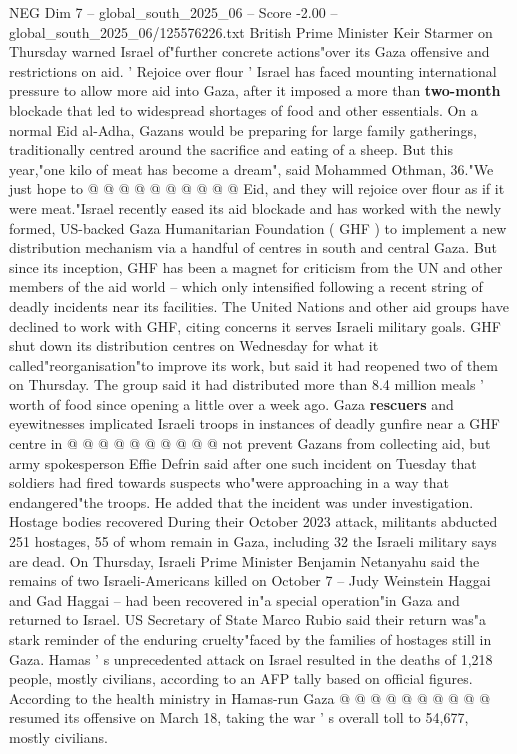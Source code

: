 \begin{textsample}{NEG Dim 7 – global\_south\_2025\_06 – Score -2.00 – global\_south\_2025\_06/125576226.txt}
British Prime Minister Keir Starmer on Thursday warned Israel of"further concrete actions"over its Gaza offensive and restrictions on aid. ' Rejoice over flour ' Israel has faced mounting international pressure to allow more aid into Gaza, after it imposed a more than \textbf{two-month} blockade that led to widespread shortages of food and other essentials.
On a normal Eid al-Adha, Gazans would be preparing for large family gatherings, traditionally centred around the sacrifice and eating of a sheep.
But this year,"one kilo of meat has become a dream", said Mohammed Othman, 36."We just hope to @ @ @ @ @ @ @ @ @ @ Eid, and they will rejoice over flour as if it were meat."Israel recently eased its aid blockade and has worked with the newly formed, US-backed Gaza Humanitarian Foundation ( GHF ) to implement a new distribution mechanism via a handful of centres in south and central Gaza.
But since its inception, GHF has been a magnet for criticism from the UN and other members of the aid world -- which only intensified following a recent string of deadly incidents near its facilities.
The United Nations and other aid groups have declined to work with GHF, citing concerns it serves Israeli military goals.
GHF shut down its distribution centres on Wednesday for what it called"reorganisation"to improve its work, but said it had reopened two of them on Thursday.
The group said it had distributed more than 8.4 million meals ' worth of food since opening a little over a week ago.
Gaza \textbf{rescuers} and eyewitnesses implicated Israeli troops in instances of deadly gunfire near a GHF centre in @ @ @ @ @ @ @ @ @ @ not prevent Gazans from collecting aid, but army spokesperson Effie Defrin said after one such incident on Tuesday that soldiers had fired towards suspects who"were approaching in a way that endangered"the troops.
He added that the incident was under investigation.
Hostage bodies recovered During their October 2023 attack, militants abducted 251 hostages, 55 of whom remain in Gaza, including 32 the Israeli military says are dead.
On Thursday, Israeli Prime Minister Benjamin Netanyahu said the remains of two Israeli-Americans killed on October 7 -- Judy Weinstein Haggai and Gad Haggai -- had been recovered in"a special operation"in Gaza and returned to Israel.
US Secretary of State Marco Rubio said their return was"a stark reminder of the enduring cruelty"faced by the families of hostages still in Gaza.
Hamas ' s unprecedented attack on Israel resulted in the deaths of 1,218 people, mostly civilians, according to an AFP tally based on official figures.
According to the health ministry in Hamas-run Gaza @ @ @ @ @ @ @ @ @ @ resumed its offensive on March 18, taking the war ' s overall toll to 54,677, mostly civilians.

\end{textsample}
